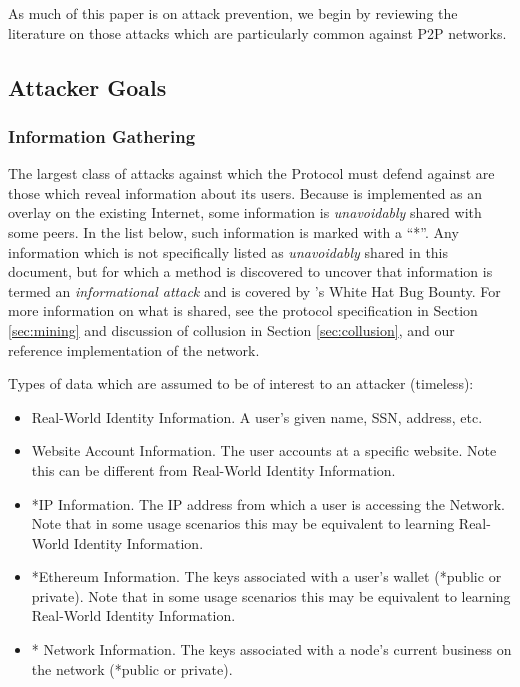 
As much of this paper is on attack prevention, we begin by reviewing
the literature on those attacks which are particularly common against
P2P networks.

\subsection{Attacker Goals}

\subsubsection{Information Gathering}

The largest class of attacks against which the \Orchid{} Protocol must defend against are those which reveal information about its users. Because \Orchid{} is implemented as an overlay on the existing Internet, some information is \emph{unavoidably} shared with some peers. In the list below, such information is marked with a “*”. Any information which is not specifically listed as \emph{unavoidably} shared in this document, but for which a method is discovered to uncover that information is termed an \emph{informational attack} and is covered by \Orchid’s White Hat Bug Bounty. For more information on what is shared, see the protocol specification in Section \ref{sec:mining} and discussion of collusion in Section \ref{sec:collusion}, and our reference implementation of the network\cite{oursoftware}.

Types of data which are assumed to be of interest to an attacker (timeless):

\begin{itemize}
\item Real-World Identity Information. A user’s given name, SSN, address, etc.
\item Website Account Information. The user accounts at a specific website. Note this can be different from Real-World Identity Information.
\item *IP Information. The IP address from which a user is accessing the \Orchid{} Network. Note that in some usage scenarios this may be equivalent to learning Real-World Identity Information.
\item *Ethereum Information. The keys associated with a user’s wallet (*public or private). Note that in some usage scenarios this may be equivalent to learning Real-World Identity Information.
\item *\Orchid{} Network Information. The keys associated with a node’s current business on the \Orchid{} network (*public or private).
\end{itemize}

